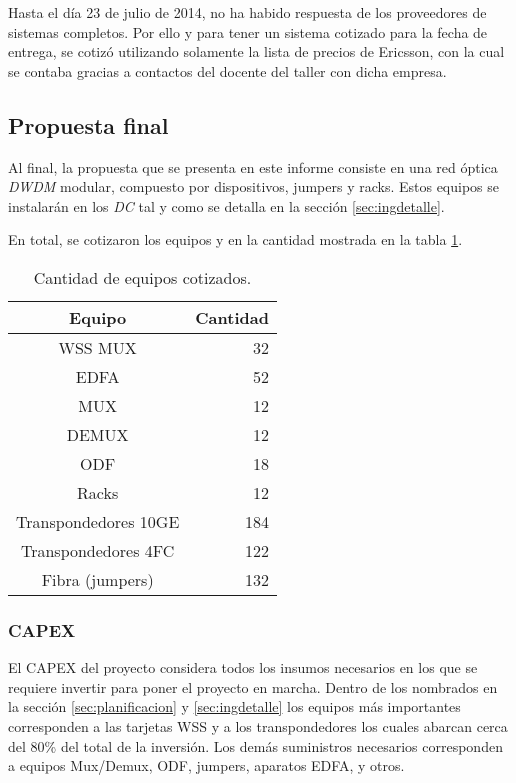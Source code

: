 
Hasta el día 23 de julio de 2014, no ha habido respuesta de los
proveedores de sistemas completos. Por ello y para tener un sistema
cotizado para la fecha de entrega, se cotizó utilizando solamente la
lista de precios de Ericsson, con la cual se contaba gracias a
contactos del docente del taller con dicha empresa.

\subsection{Propuesta final}
\label{sec:ppfinal}

Al final, la propuesta que se presenta en este informe consiste en una
red óptica \emph{DWDM} modular, compuesto por dispositivos, jumpers y
racks. Estos equipos se instalarán en los \emph{DC} tal y como se
detalla en la sección \ref{sec:ingdetalle}.

En total, se cotizaron los equipos y en la cantidad mostrada en la
tabla \ref{tab:propfinal}.

\begin{table}[H]
  \centering
  \begin{tabular}{| c | r |}
    \hline
    Equipo & Cantidad \\
    \hline
    WSS MUX & 32 \\
    EDFA & 52 \\
    MUX & 12 \\
    DEMUX & 12 \\
    ODF & 18 \\
    Racks & 12 \\
    Transpondedores 10GE & 184 \\
    Transpondedores 4FC & 122 \\
    Fibra (jumpers) & 132 \\
    \hline
  \end{tabular}
  \caption{Cantidad de equipos cotizados.}
  \label{tab:propfinal}
\end{table}

\subsubsection{CAPEX}
\label{sec:capex}

El CAPEX del proyecto considera todos los insumos necesarios en los que se requiere invertir para poner el proyecto en marcha. Dentro de los nombrados en la sección \ref{sec:planificacion} y \ref{sec:ingdetalle} los equipos más importantes corresponden a las tarjetas WSS y a los transpondedores los cuales abarcan cerca del 80\% del total de la inversión. Los demás suministros necesarios corresponden a equipos Mux/Demux, ODF, jumpers, aparatos EDFA, y otros.

